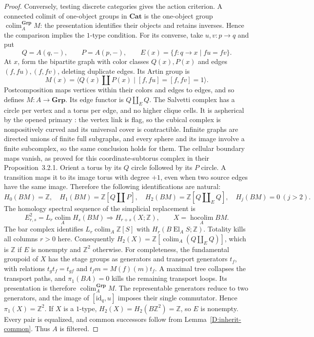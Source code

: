 \documentclass[11pt,a4paper]{article}
\newcommand{\Cat}{\mathbf{Cat}}
\newcommand{\Grp}{\mathbf{Grp}}
\newcommand{\Z}{\mathbb Z}
\newcommand{\El}{\operatorname{El}}
\newcommand{\colim}{\operatorname*{colim}}
\newcommand{\hocolim}{\operatorname*{hocolim}}
\newcommand{\id}{\mathrm{id}}
\theoremstyle{definition}
\begin{document}
\begin{proof}
Conversely, testing discrete categories gives the action criterion.
A connected colimit of one-object groups in $\Cat$ is the one-object
group $\colim^{\Grp}_A M$: the presentation identifies their objects
and retains inverses. Hence the comparison implies the $1$-type
condition. For its converse, take $u,v:p\to q$ and put
\[
Q=A(q,-),\qquad P=A(p,-),\qquad
E(x)=\{f:q\to x\mid fu=fv\}.
\]
At $x$, form the bipartite graph with color classes $Q(x),P(x)$ and
edges $(f,fu),(f,fv)$, deleting duplicate edges. Its Artin group is
\[
M(x)=\langle Q(x)\amalg P(x)\mid[f,fu]=[f,fv]=1\rangle.
\]
Postcomposition maps vertices within their colors and edges to
edges, and so defines $M:A\to\Grp$. Its edge functor is
$Q\amalg_E Q$. The Salvetti complex has a circle per vertex and a
torus per edge, and no higher clique cells. It is aspherical by the opened primary \citet[Theorem~3.1.1, Remark~3.1.2, and Lemma~3.1.3]{CharneyDavis1995Finite}: the vertex link is flag, so the cubical complex is nonpositively curved and its universal cover is contractible. Infinite graphs are directed unions of finite full
subgraphs, and every sphere and its image involve a finite
subcomplex, so the same conclusion holds for them. The cellular boundary maps vanish, as proved for this coordinate-subtorus complex in their Proposition~3.2.1. Orient a torus by its $Q$ circle followed by
its $P$ circle. A transition maps it to its image torus with degree
$+1$, even when two source edges have the same image. Therefore the
following identifications are natural:
\[
H_0(BM)=\Z,\quad H_1(BM)=\Z[Q\amalg P],\quad
H_2(BM)=\Z[Q\amalg_E Q],\quad H_j(BM)=0\ (j>2).
\]
The homology spectral sequence of the simplicial replacement is
\[
E^2_{r,s}=L_r\colim_A H_s(BM)\Longrightarrow
H_{r+s}(X;\Z),\qquad X=\hocolim_A BM.
\]
The bar complex identifies $L_r\colim_A\Z[S]$ with
$H_r(B\El_A S;\Z)$. Totality kills all columns $r>0$ here.
Consequently $H_2(X)=\Z[\colim_A(Q\amalg_E Q)]$, which is
$\Z$ if $E$ is nonempty and $\Z^2$ otherwise.
For completeness, the fundamental groupoid of $X$ has the stage
groups as generators and transport generators $t_f$, with relations
$t_gt_f=t_{gf}$ and $t_fm=M(f)(m)t_f$. A maximal tree collapses the
transport paths, and $\pi_1(BA)=0$ kills the remaining transport
loops. Its presentation is therefore $\colim^{\Grp}_A M$. The
representable generators reduce to two generators, and the image
of $[\id_q,u]$ imposes their single commutator. Hence
$\pi_1(X)=\Z^2$. If $X$ is a $1$-type, $H_2(X)=H_2(B\Z^2)=\Z$,
so $E$ is nonempty. Every pair is equalized, and common successors
follow from Lemma~\ref{D:inherit-common}. Thus $A$ is filtered.
\end{proof}
\end{document}
